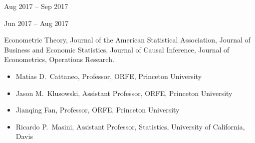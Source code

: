 \documentclass[
  date,
  number,
]{wgu-cv}
\begin{document}
{}
{Aug 2017 -- Sep 2017}
\vspace*{2mm}

{}
{Jun 2017 -- Aug 2017}


Econometric Theory,
Journal of the American Statistical Association,
Journal of Business and Economic Statistics,
Journal of Causal Inference,
Journal of Econometrics,
Operations Research.


\vspace*{-2mm}

\begin{itemize}

  \item
    Matias D.\ Cattaneo,
    Professor,
    ORFE,
    Princeton University

  \item
    Jason M.\ Klusowski,
    Assistant Professor,
    ORFE,
    Princeton University

  \item
    Jianqing Fan,
    Professor,
    ORFE,
    Princeton University

  \item
    Ricardo P.\ Masini,
    Assistant Professor,
    Statistics,
    University of California, Davis

\end{itemize}

\end{document}
